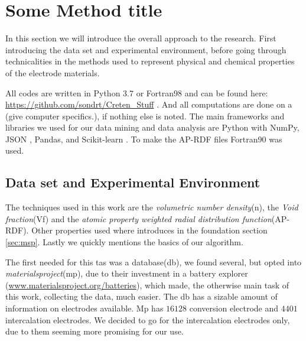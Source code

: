 \section{Some Method title}
In this section we will introduce the overall approach to the research. First introducing the data set and experimental environment, before going through technicalities in the methods used to represent physical and chemical properties of the electrode materials.

All codes are written in Python 3.7\cite{van1995python} or Fortran98\cite{backus1964fortran} and can be found here: \url{https://github.com/sondrt/Creten_Stuff} . And all computations are done on a (give computer specifics.), if nothing else is noted. The main frameworks and libraries we used for our data mining and data analysis are Python with NumPy\cite{oliphant2006guide}, JSON \cite{pezoa2016foundations}, Pandas\cite{mckinney-proc-scipy-2010}, and Scikit-learn \cite{scikit-learn}.
To make the AP-RDF files Fortran90 was used. 

\subsection{Data set and Experimental Environment}

	 The techniques used in this work are the \textit{volumetric number density}(n), the \textit{Void fraction}(Vf) and the \textit{atomic property weighted radial distribution function}(AP-RDF). Other properties used where introduces in the foundation section \ref{sec:msp}. Lastly we quickly mentions the basics of our algorithm. 
 

	 The first needed for this tas was a database(db), we found several, but opted into \textit{materialsproject}\cite{doi:10.1038/sdata.2015.9}(mp), due to their investment in a battery explorer (\url{www.materialsproject.org/batteries}), which made, the otherwise main task of this work, collecting the data, much easier. The db has a sizable amount of information on electrodes available. Mp has $16128$ conversion electrode and $4401$ intercalation electrodes. We decided to go for the intercalation electrodes only, due to them seeming more promising for our use. 
	 
